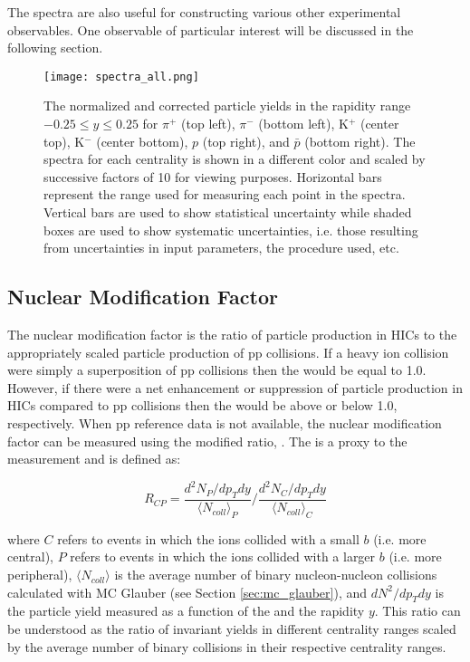 	The spectra are also useful for constructing various other experimental observables. One observable of particular interest will be discussed in the following section.

	\begin{sidewaysfigure}[ht]
		\centering 
		\texttt{[image: spectra\_all.png]} 

		\centering
		\caption{ \label{fig:spectra} The normalized and corrected particle yields in the rapidity range $-0.25 \leq y \leq 0.25 $ for $\pi^{+}$ (top left), $\pi^{-}$ (bottom left), K$^{+}$ (center top), K$^-$ (center bottom), $p$ (top right), and $\bar{p}$ (bottom right). The spectra for each centrality is shown in a different color and scaled by successive factors of 10 for viewing purposes. Horizontal bars represent the \pt range used for measuring each point in the spectra. Vertical bars are used to show statistical uncertainty while shaded boxes are used to show systematic uncertainties, i.e. those resulting from uncertainties in input parameters, the procedure used, etc. } 
	\end{sidewaysfigure}

	\subsection{Nuclear Modification Factor}
	\label{sec:rcp}
	The nuclear modification factor \raa is the ratio of particle production in HICs to the appropriately scaled particle production of pp collisions. If a heavy ion collision were simply a superposition of pp collisions then the \raa would be equal to 1.0. However, if there were a net enhancement or suppression of particle production in HICs compared to pp collisions then the \raa would be above or below 1.0, respectively. When pp reference data is not available, the nuclear modification factor can be measured using the modified ratio, \rcp. The \rcp is a proxy to the \raa measurement and is defined as:

	\begin{equation}
		R_{CP} = \frac{d^2 N_{P} / dp_{T}dy}{\langle N_{coll} \rangle_{P}} 
				\Big/ \frac{d^2 N_{C} / dp_{T}dy}{\langle N_{coll} \rangle_{C}}
		\label{eq:r_cp}
	\end{equation}

	\noindent
	where $C$ refers to events in which the ions collided with a small $b$ (i.e. more central), $P$ refers to events in which the ions collided with a larger $b$ (i.e. more peripheral), $\langle N_{coll} \rangle $ is the average number of binary nucleon-nucleon collisions calculated with MC Glauber (see Section \ref{sec:mc_glauber}), and $dN^2/dp_T dy$ is the particle yield measured as a function of the \pt and the rapidity $y$. This ratio can be understood as the ratio of invariant yields in different centrality ranges scaled by the average number of binary collisions in their respective centrality ranges.

